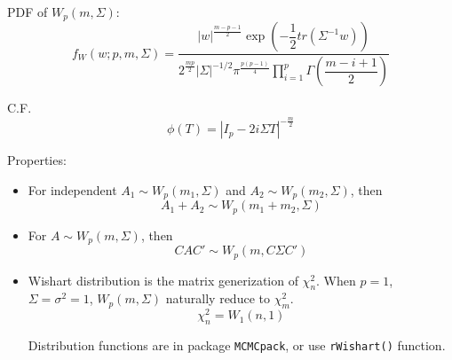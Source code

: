 \begin{itemize}[topsep=2pt,itemsep=2pt]
        
        PDF of $ W_p(m,\Sigma ) $:
        \begin{equation}
            f_W(w;p,m,\Sigma )= \dfrac{|w|^{\frac{m-p-1}{2}}\exp\left( -\dfrac{1}{2}tr(\Sigma ^{-1}w) \right)}{2^{\frac{mp}{2}}|\Sigma |^{-1/2}\pi^{\frac{p(p-1)}{4}}{\displaystyle\prod_{i=1}^p\Gamma (\dfrac{m-i+1}{2})} }
        \end{equation}

 
        
        C.F.
        \begin{equation}
            \phi(T)=|I_p-2i\Sigma T|^{-\frac{m}{2}} 
        \end{equation}


    Properties:
    \begin{itemize}[topsep=2pt,itemsep=2pt]
        \item For independent $ A_1\sim W_p(m_1,\Sigma ) $ and $ A_2\sim W_p(m_2,\Sigma ) $, then 
        \begin{equation}
            A_{1}+A_{2} \sim W_p(m_1+m_2,\Sigma )
        \end{equation}
        
        \item For $ A\sim W_p(m,\Sigma ) $, then
        \begin{equation}
            CAC'\sim W_p(m,C\Sigma C') 
        \end{equation}
        \item Wishart distribution is the matrix generization of $ \chi^2_n $. When $ p=1 $, $ \Sigma =\sigma ^2=1 $, $ W_p(m,\Sigma ) $ naturally reduce to $ \chi^2_m $.
        \begin{equation}
            \chi^2_n=W_1(n,1) 
        \end{equation}
        

\begin{rcode}
    Distribution functions are in package \lstinline|MCMCpack|, or use \lstinline|rWishart()| function.
\end{rcode}
        

    
    
\end{itemize}
    
\end{itemize}

